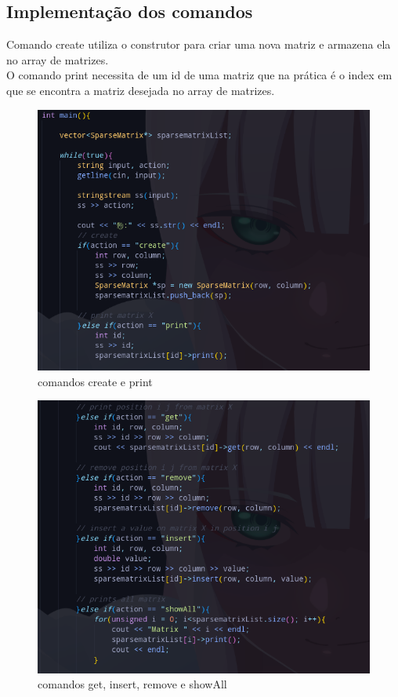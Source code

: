 \documentclass[a4paper,12pt]{article}
\begin{document}
\subsection{Implementação dos comandos}
Comando create utiliza o construtor para criar uma nova matriz e armazena ela no array de matrizes.\\
O comando print necessita de um id de uma matriz que na prática é o index em que se encontra a matriz desejada no array de matrizes.
\begin{figure}[H]
\centering
\includegraphics[width=1\textwidth]{Imagens/main/main-comandos-pt1.png}
\caption{\label{fig:createandprint} comandos create e print}
\end{figure}


\begin{figure}[H]
\centering
\includegraphics[width=1\textwidth]{Imagens/main/main-comandos-pt2.png}
\caption{\label{fig:gettoshowall} comandos get, insert, remove e showAll}
\end{figure}
\end{document}
